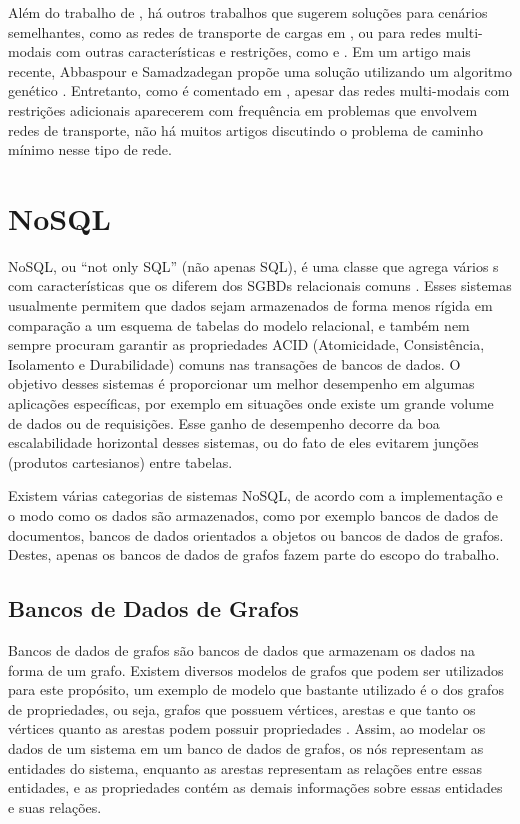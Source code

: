 Além do trabalho de \cite{kao2008}, há outros trabalhos que sugerem soluções para cenários semelhantes, como as redes de transporte de cargas em \cite{Ziliaskopoulos2000486}, ou para redes multi-modais com outras características e restrições, como \cite{Lozano2001225} e \cite{Lozano2002853}. Em um artigo mais recente, Abbaspour e Samadzadegan propõe uma solução utilizando um algoritmo genético \cite{abbaspour2009}. Entretanto, como é comentado em \cite{Lozano2001225}, apesar das redes multi-modais com restrições adicionais aparecerem com frequência em problemas que envolvem redes de transporte, não há muitos artigos discutindo o problema de caminho mínimo nesse tipo de rede. 


\section{NoSQL}

NoSQL, ou ``not only SQL'' (não apenas SQL), é uma classe que agrega vários s com características que os diferem dos SGBDs relacionais comuns \cite{wikinosql}.
Esses sistemas usualmente permitem que dados sejam armazenados de forma menos rígida em comparação a um esquema de tabelas do modelo relacional, e também nem sempre procuram garantir as propriedades ACID (Atomicidade, Consistência, Isolamento e Durabilidade) comuns nas transações de bancos de dados.
O objetivo desses sistemas é proporcionar um melhor desempenho em algumas aplicações específicas, por exemplo em situações onde existe um grande volume de dados ou de requisições. Esse ganho de desempenho decorre da boa escalabilidade horizontal desses sistemas, ou do fato de eles evitarem junções (produtos cartesianos) entre tabelas.

Existem várias categorias de sistemas NoSQL, de acordo com a implementação e o modo como os dados são armazenados, como por exemplo bancos de dados de documentos, bancos de dados orientados a objetos ou bancos de dados de grafos.
Destes, apenas os bancos de dados de grafos fazem parte do escopo do trabalho.

\subsection{Bancos de Dados de Grafos}


Bancos de dados de grafos são bancos de dados que armazenam os dados na forma de um grafo. Existem diversos modelos de grafos que podem ser utilizados para este propósito, um exemplo de modelo que bastante utilizado é o dos grafos de propriedades, ou seja, grafos que possuem vértices, arestas e que tanto os vértices quanto as arestas podem possuir propriedades \cite{wikigraphdb}.
Assim, ao modelar os dados de um sistema em um banco de dados de grafos, os nós representam as entidades do sistema, enquanto as arestas representam as relações entre essas entidades, e as propriedades contém as demais informações sobre essas entidades e suas relações.

